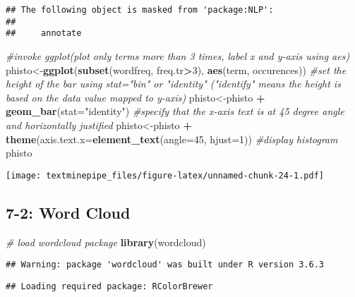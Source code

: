 \documentclass[
]{article}
\newenvironment{Shaded}{\begin{snugshade}}{\end{snugshade}}
\newcommand{\CommentTok}[1]{\textcolor[rgb]{0.56,0.35,0.01}{\textit{#1}}}
\newcommand{\DataTypeTok}[1]{\textcolor[rgb]{0.13,0.29,0.53}{#1}}
\newcommand{\DecValTok}[1]{\textcolor[rgb]{0.00,0.00,0.81}{#1}}
\newcommand{\KeywordTok}[1]{\textcolor[rgb]{0.13,0.29,0.53}{\textbf{#1}}}
\newcommand{\NormalTok}[1]{#1}
\newcommand{\OperatorTok}[1]{\textcolor[rgb]{0.81,0.36,0.00}{\textbf{#1}}}
\newcommand{\StringTok}[1]{\textcolor[rgb]{0.31,0.60,0.02}{#1}}
\begin{document}
\begin{verbatim}
## The following object is masked from 'package:NLP':
## 
##     annotate
\end{verbatim}

\begin{Shaded}
\begin{Highlighting}[]
\CommentTok{#invoke ggplot(plot only terms more than 3 times, label x and y-axis using aes)}
\NormalTok{phisto<-}\KeywordTok{ggplot}\NormalTok{(}\KeywordTok{subset}\NormalTok{(wordfreq, freq.tr}\OperatorTok{>}\DecValTok{3}\NormalTok{), }\KeywordTok{aes}\NormalTok{(term, occurences))}
\CommentTok{#set the height of the bar using stat="bin" or "identity" ("identify" means the height is based on the data value mapped to y-axis)}
\NormalTok{phisto<-phisto }\OperatorTok{+}\StringTok{ }\KeywordTok{geom_bar}\NormalTok{(}\DataTypeTok{stat=}\StringTok{"identity"}\NormalTok{)}
\CommentTok{#specify that the x-axis text is at 45 degree angle and horizontally justified}
\NormalTok{phisto<-phisto }\OperatorTok{+}\StringTok{ }\KeywordTok{theme}\NormalTok{(}\DataTypeTok{axis.text.x=}\KeywordTok{element_text}\NormalTok{(}\DataTypeTok{angle=}\DecValTok{45}\NormalTok{, }\DataTypeTok{hjust=}\DecValTok{1}\NormalTok{))}
\CommentTok{#display histogram}
\NormalTok{phisto}
\end{Highlighting}
\end{Shaded}

\texttt{[image: textminepipe\_files/figure-latex/unnamed-chunk-24-1.pdf]}

\hypertarget{word-cloud}{%
\subsection{7-2: Word Cloud}\label{word-cloud}}

\begin{Shaded}
\begin{Highlighting}[]
\CommentTok{# load wordcloud package}
\KeywordTok{library}\NormalTok{(wordcloud)}
\end{Highlighting}
\end{Shaded}

\begin{verbatim}
## Warning: package 'wordcloud' was built under R version 3.6.3
\end{verbatim}

\begin{verbatim}
## Loading required package: RColorBrewer
\end{verbatim}
\end{document}
